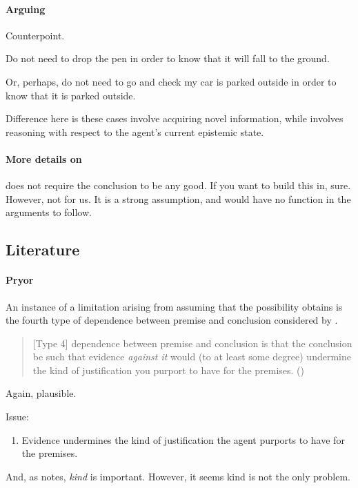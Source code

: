 \paragraph*{Arguing}


\begin{note}
  Counterpoint.

  Do not need to drop the pen in order to know that it will fall to the ground.

  Or, perhaps, do not need to go and check my car is parked outside in order to know that it is parked outside.

  Difference here is these cases involve acquiring novel information, while \qzS{} involves reasoning with respect to the agent's current epistemic state.
\end{note}

\paragraph{More details on \zetaS{}}

\begin{note}
  \zS{} does not require the conclusion to be any good.
  If you want to build this in, sure.
  However, not for us.
  It is a strong assumption, and would have no function in the arguments to follow.
\end{note}

\subsection{Literature}
\label{sec:zS:literature}

\paragraph{Pryor}

\begin{note}
  An instance of a limitation arising from assuming that the possibility obtains is the fourth type of dependence between premise and conclusion considered by \citeauthor{Pryor:2004ws}.

  \begin{quote}
    [Type 4] dependence between premise and conclusion is that the conclusion be such that evidence \emph{against it} would (to at least some degree) undermine the kind of justification you purport to have for the premises.%
    \mbox{}\hfill\mbox{(\citeyear[359]{Pryor:2004ws})}
  \end{quote}

  Again, plausible.

  Issue:
  \begin{enumerate}
  \item Evidence undermines the kind of justification the agent purports to have for the premises.
  \end{enumerate}

  And, as \citeauthor{Pryor:2004ws} notes, \emph{kind} is important.
  However, it seems kind is not the only problem.
\end{note}

